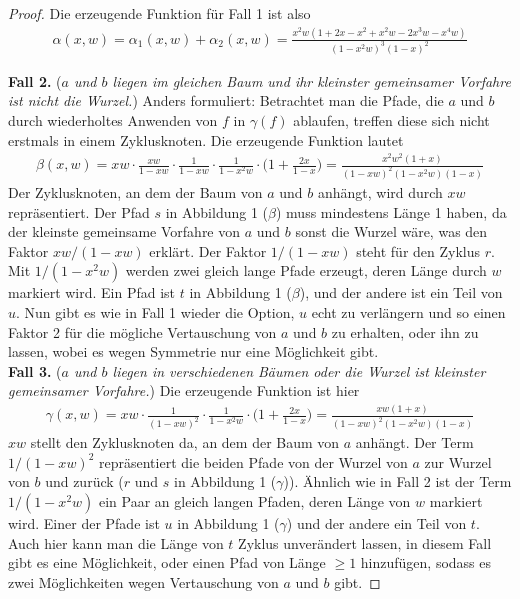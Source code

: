 \documentclass[a4paper, 10pt, ngerman]{article}
\begin{document}
\begin{proof}
    \noindent Die erzeugende Funktion für Fall 1 ist also
    \begin{align*}
        \alpha(x, w)
        = \alpha_1(x, w) + \alpha_2(x, w)
        = \frac {x^2w(1 + 2x - x^2 + x^2w - 2x^3w - x^4w)} {(1 - x^2w)^3(1 - x)^2}
    \end{align*}

    \noindent \textbf{Fall 2.} (\emph{$a$ und $b$ liegen im gleichen Baum und ihr kleinster gemeinsamer Vorfahre ist nicht die Wurzel.}) Anders formuliert: Betrachtet man die Pfade, die $a$ und $b$ durch wiederholtes Anwenden von $f$ in $\gamma(f)$ ablaufen, treffen diese sich nicht erstmals in einem Zyklusknoten. Die erzeugende Funktion lautet
    \begin{align*}
        \beta(x, w)
        = xw \cdot \frac {xw} {1 - xw} \cdot \frac {1} {1 - xw} \cdot \frac {1} {1 - x^2w} \cdot \Bigg (1 + \frac {2x} {1 - x} \Bigg )
        = \frac {x^2w^2(1 + x)} {(1 - xw)^2(1 - x^2w)(1 - x)}
    \end{align*}
    Der Zyklusknoten, an dem der Baum von $a$ und $b$ anhängt, wird durch $xw$ repräsentiert. Der Pfad $s$ in Abbildung 1 ($\beta$) muss mindestens Länge 1 haben, da der kleinste gemeinsame Vorfahre von $a$ und $b$ sonst die Wurzel wäre, was den Faktor $xw/(1 - xw)$ erklärt. Der Faktor $1/(1 - xw)$ steht für den Zyklus $r$. Mit $1/(1 - x^2w)$ werden zwei gleich lange Pfade erzeugt, deren Länge durch $w$ markiert wird. Ein Pfad ist $t$ in Abbildung 1 ($\beta$), und der andere ist ein Teil von $u$. Nun gibt es wie in Fall 1 wieder die Option, $u$ echt zu verlängern und so einen Faktor 2 für die mögliche Vertauschung von $a$ und $b$ zu erhalten, oder ihn zu lassen, wobei es wegen Symmetrie nur eine Möglichkeit gibt.
    \\

    \noindent \textbf{Fall 3.} (\emph{$a$ und $b$ liegen in verschiedenen Bäumen oder die Wurzel ist kleinster gemeinsamer Vorfahre.}) Die erzeugende Funktion ist hier
    \begin{align*}
        \gamma(x, w)
        = xw \cdot \frac {1} {(1 - xw)^2} \cdot \frac {1} {1 - x^2w} \cdot \Bigg (1 + \frac {2x}{1 - x} \Bigg )
        = \frac {xw(1 + x)} {(1 - xw)^2(1 - x^2w)(1 - x)}
    \end{align*}
    $xw$ stellt den Zyklusknoten da, an dem der Baum von $a$ anhängt. Der Term $1/(1 - xw)^2$ repräsentiert die beiden Pfade von der Wurzel von $a$ zur Wurzel von $b$ und zurück ($r$ und $s$ in Abbildung 1 ($\gamma$)). Ähnlich wie in Fall 2 ist der Term $1/(1 - x^2w)$ ein Paar an gleich langen Pfaden, deren Länge von $w$ markiert wird. Einer der Pfade ist $u$ in Abbildung 1 ($\gamma$) und der andere ein Teil von $t$. Auch hier kann man die Länge von $t$ Zyklus unverändert lassen, in diesem Fall gibt es eine Möglichkeit, oder einen Pfad von Länge $\ge 1$ hinzufügen, sodass es zwei Möglichkeiten wegen Vertauschung von $a$ und $b$ gibt.


\end{proof}
\end{document}
